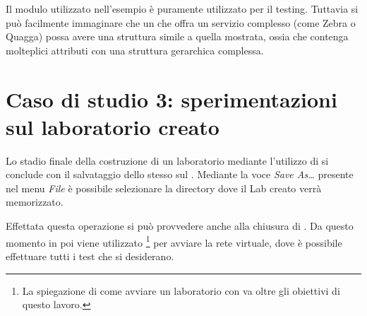 Il modulo utilizzato nell'esempio è puramente utilizzato per il testing. Tuttavia si può facilmente immaginare che un \plugin{} che offra un servizio complesso (come Zebra o Quagga) possa avere una struttura simile a quella mostrata, ossia che contenga molteplici attributi con una struttura gerarchica complessa.

\section{Caso di studio 3: sperimentazioni sul laboratorio creato}
Lo stadio finale della costruzione di un laboratorio mediante l'utilizzo di \visualnetkit{} si conclude con il salvataggio dello stesso sul \fs{}. Mediante la voce \emph{Save As\ldots} presente nel menu \emph{File} è possibile selezionare la directory dove il Lab creato verrà memorizzato.

Effettata questa operazione si può provvedere anche alla chiusura di \visualnetkit{}. Da questo momento in poi viene utilizzato \netkit{}\footnote{La spiegazione di come avviare un laboratorio con \netkit{} va oltre gli obiettivi di questo lavoro.} per avviare la rete virtuale, dove è possibile effettuare tutti i test che si desiderano.

